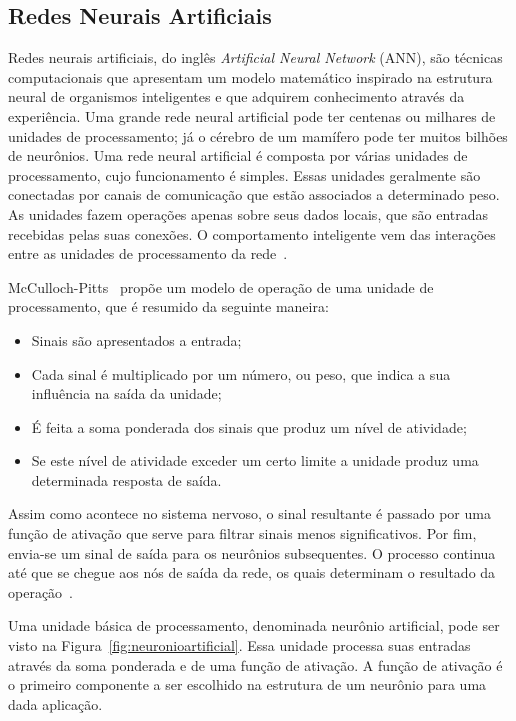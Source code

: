 \subsection{Redes Neurais Artificiais}
\label{sec:redesneuraisArtificiais}

Redes neurais artificiais, do inglês \textit{Artificial Neural Network} (ANN), são técnicas computacionais que apresentam um modelo matemático inspirado na estrutura neural de organismos inteligentes e que adquirem conhecimento através da experiência. Uma grande rede neural artificial pode ter centenas ou milhares de unidades de processamento; já o cérebro de um mamífero pode ter muitos bilhões de neurônios. Uma rede neural artificial é composta por várias unidades de processamento, cujo funcionamento é simples. Essas unidades geralmente são conectadas por canais de comunicação que estão associados a determinado peso. As unidades fazem operações apenas sobre seus dados locais, que são entradas recebidas pelas suas conexões. O comportamento inteligente vem das interações entre as unidades de processamento da rede~\cite{andreCarvalhoRNA}.

McCulloch-Pitts~\cite{830886} propõe um modelo de operação de uma unidade de processamento, que é resumido da seguinte maneira:
\begin{itemize}
    \item Sinais são apresentados a entrada;
    \item Cada sinal é multiplicado por um número, ou peso, que indica a sua influência na saída da unidade;
    \item É feita a soma ponderada dos sinais que produz um nível de atividade;
    \item Se este nível de atividade exceder um certo limite a unidade produz uma determinada resposta de saída.
\end{itemize}

Assim como acontece no sistema nervoso, o sinal resultante é passado por uma função de ativação que serve para filtrar sinais menos significativos. Por fim, envia-se um sinal de saída para os neurônios subsequentes. O processo continua até que se chegue aos nós de saída da rede, os quais determinam o resultado da operação~\cite{rashid2016make}.

Uma unidade básica de processamento, denominada neurônio artificial, pode ser visto na Figura~\ref{fig:neuronioartificial}. Essa unidade processa suas entradas através da soma ponderada e de uma função de ativação. A função de ativação é o primeiro componente a ser escolhido na estrutura de um neurônio para uma dada aplicação.

